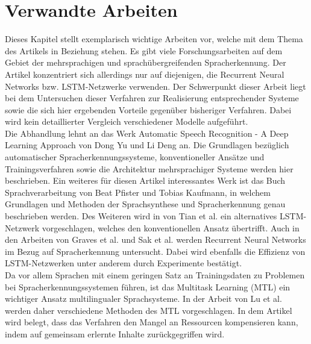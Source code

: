 \section{Verwandte Arbeiten}
Dieses Kapitel stellt exemplarisch wichtige Arbeiten vor, welche mit dem Thema des Artikels in Beziehung stehen. Es gibt viele Forschungsarbeiten auf dem Gebiet der mehrsprachigen und sprachübergreifenden Spracherkennung. Der Artikel konzentriert sich allerdings nur auf diejenigen, die Recurrent Neural Networks bzw. LSTM-Netzwerke verwenden. Der Schwerpunkt dieser Arbeit liegt bei dem Untersuchen dieser Verfahren zur Realisierung entsprechender Systeme sowie die sich hier ergebenden Vorteile gegenüber bisheriger Verfahren. Dabei wird kein detaillierter Vergleich verschiedener Modelle aufgeführt. \\ 
Die Abhandlung lehnt an das Werk Automatic Speech Recognition - A Deep Learning Approach von Dong Yu und Li Deng \cite{Yu.2014} an. Die Grundlagen bezüglich automatischer Spracherkennungssysteme, konventioneller Ansätze und Trainingsverfahren sowie die Architektur mehrsprachiger Systeme werden hier beschrieben.
Ein weiteres für diesen Artikel interessantes Werk ist das Buch Sprachverarbeitung von Beat Pfister und Tobias Kaufmann, in welchem Grundlagen und Methoden der Sprachsynthese und Spracherkennung genau beschrieben werden.  
Des Weiteren wird in \cite{2017arXiv170307090T} von Tian et al. ein alternatives LSTM-Netzwerk vorgeschlagen, welches den konventionellen Ansatz übertrifft. Auch in den Arbeiten von Graves et al. {\cite{6638947}} und Sak et al. \cite{2014arXiv1402} werden Recurrent Neural Networks im Bezug auf Spracherkennung untersucht. Dabei wird ebenfalls die Effizienz von LSTM-Netzwerken unter anderem durch Experimente bestätigt. \\Da vor allem Sprachen mit einem geringen Satz an Trainingsdaten zu Problemen bei Spracherkennungssystemen führen, ist das Multitask Learning (MTL) ein wichtiger Ansatz multilingualer Sprachsysteme. In der Arbeit von Lu et al. \cite{multitask} werden daher verschiedene Methoden des MTL vorgeschlagen. In dem Artikel wird belegt, dass das Verfahren den Mangel an Ressourcen kompensieren kann, indem auf gemeinsam erlernte Inhalte zurückgegriffen wird.


